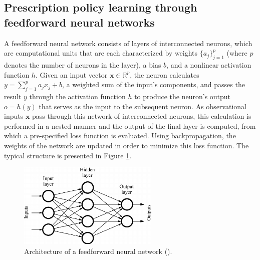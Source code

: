 \documentclass[10pt]{article} %
\begin{document}
\subsection{Prescription policy learning through feedforward neural networks}\label{subsec:prescription-policy-learning}

A feedforward neural network consists of layers of interconnected neurons, which are computational units that are each characterized by weights $\{a_{j}\}_{j=1}^p$ (where $p$ denotes the number of neurons in the layer), a bias $b$, and a nonlinear activation function $h$. Given an input vector $\boldsymbol{x}\in\mathbb{R}^p$, the neuron calculates $y = \sum_{j=1}^{p}a_{j}x_{j} + b$, a weighted sum of the input's components, and passes the result $y$ through the activation function $h$ to produce the neuron's output $o=h(y)$ that serves as the input to the subsequent neuron. As observational inputs $\boldsymbol{x}$ pass through this network of interconnected neurons, this calculation is performed in a nested manner and the output of the final layer is computed, from which a pre-specified loss function is evaluated. Using backpropagation, the weights of the network are updated in order to minimize this loss function. The typical structure is presented in Figure \ref{fig:fnn}.

\begin{figure}[!ht]
  \begin{center}
    \caption{Architecture of a feedforward neural network (\citet{fnn-image}).}\label{fig:fnn}
  \includegraphics[width=0.6\textwidth]{images/nn.png}
  \end{center}
\end{figure}
\end{document}
